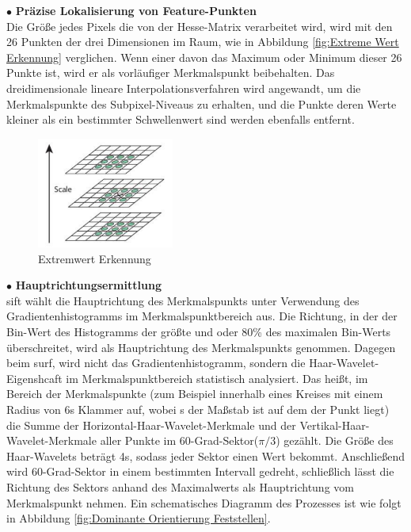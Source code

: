 $\bullet$ \textbf{Präzise Lokalisierung von Feature-Punkten}\\
Die Größe jedes Pixels die von der Hesse-Matrix verarbeitet wird, wird mit den 26 Punkten der drei Dimensionen im Raum, wie in Abbildung \ref{fig:Extreme Wert Erkennung} verglichen. Wenn einer davon das Maximum oder Minimum dieser 26 Punkte ist, wird er als vorläufiger Merkmalspunkt beibehalten. Das dreidimensionale lineare Interpolationsverfahren wird angewandt, um die Merkmalspunkte des Subpixel-Niveaus zu erhalten, und die Punkte deren Werte kleiner als ein bestimmter Schwellenwert sind werden ebenfalls entfernt.

\begin{figure}[htb]
 \centering 
 \includegraphics[keepaspectratio,width=0.4\textwidth]{images/3_Ersteverfahren/Extreme_Wert_Erkennung.pdf}
 \caption{Extremwert Erkennung}
 \label{fig:Extremwert Erkennung}
\end{figure} 


$\bullet$ \textbf{Hauptrichtungsermittlung}\\
\gls{sift} wählt die Hauptrichtung des Merkmalspunkts unter Verwendung des Gradientenhistogramms im Merkmalspunktbereich aus. Die Richtung, in der der Bin-Wert des Histogramms der größte und oder 80\% des maximalen Bin-Werts überschreitet, wird als Hauptrichtung des Merkmalspunkts genommen. Dagegen beim \gls{surf}, wird nicht das Gradientenhistogramm, sondern die Haar-Wavelet-Eigenshcaft im Merkmalspunktbereich statistisch analysiert. Das heißt, im Bereich der Merkmalspunkte (zum Beispiel innerhalb eines Kreises mit einem Radius von 6\si{s} Klammer auf, wobei s der Maßstab ist auf dem der Punkt liegt) die Summe der Horizontal-Haar-Wavelet-Merkmale und der Vertikal-Haar-Wavelet-Merkmale aller Punkte im  60-Grad-Sektor($\pi/3$) gezählt. Die Größe des Haar-Wavelets beträgt 4\si{s}, sodass jeder Sektor einen Wert bekommt. Anschließend wird 60-Grad-Sektor in einem bestimmten Intervall gedreht, schließlich lässt die Richtung des Sektors anhand des Maximalwerts als Hauptrichtung vom Merkmalspunkt nehmen. Ein schematisches Diagramm des Prozesses ist wie folgt in Abbildung \ref{fig:Dominante Orientierung Feststellen}.

